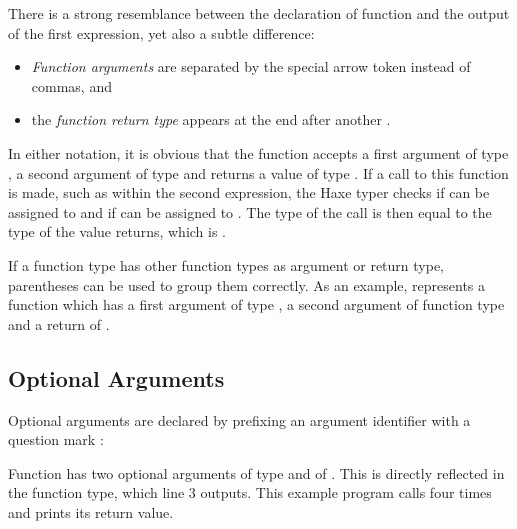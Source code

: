 
There is a strong resemblance between the declaration of function  and the output of the first  expression, yet also a subtle difference:

\begin{itemize}
	\item \emph{Function arguments} are separated by the special arrow token \expr{->} instead of commas, and
	\item the \emph{function return type} appears at the end after another \expr{->}.
\end{itemize}

In either notation, it is obvious that the function  accepts a first argument of type , a second argument of type  and returns a value of type . If a call to this function is made, such as  within the second  expression, the Haxe typer checks if  can be assigned to  and if  can be assigned to . The type of the call is then equal to the type of the value  returns, which is .

If a function type has other function types as argument or return type, parentheses can be used to group them correctly. As an example,  represents a function which has a first argument of type , a second argument of function type  and a return of .



\subsection{Optional Arguments}
\label{types-function-optional-arguments}

Optional arguments are declared by prefixing an argument identifier with a question mark :

Function  has two optional arguments  of type  and  of . This is directly reflected in the function type, which line 3 outputs. 
This example program calls  four times and prints its return value.


